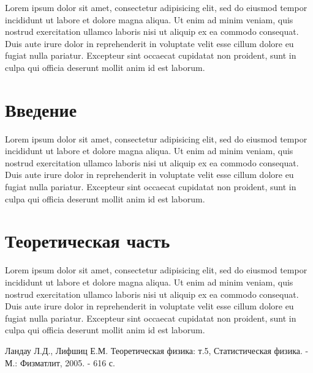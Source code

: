 \documentclass[a4paper,14pt]{extarticle}
\begin{document}
Lorem ipsum dolor sit amet, consectetur adipisicing elit, sed do eiusmod
tempor incididunt ut labore et dolore magna aliqua. Ut enim ad minim veniam,
quis nostrud exercitation ullamco laboris nisi ut aliquip ex ea commodo
consequat. Duis aute irure dolor in reprehenderit in voluptate velit esse
cillum dolore eu fugiat nulla pariatur. Excepteur sint occaecat cupidatat non
proident, sunt in culpa qui officia deserunt mollit anim id est laborum.


\section*{Введение}

Lorem ipsum dolor sit amet, consectetur adipisicing elit, sed do eiusmod
tempor incididunt ut labore et dolore magna aliqua. Ut enim ad minim veniam,
quis nostrud exercitation ullamco laboris nisi ut aliquip ex ea commodo
consequat. Duis aute irure dolor in reprehenderit in voluptate velit esse
cillum dolore eu fugiat nulla pariatur. Excepteur sint occaecat cupidatat non
proident, sunt in culpa qui officia deserunt mollit anim id est laborum.

\section{Теоретическая часть}

Lorem ipsum dolor sit amet, consectetur adipisicing elit, sed do eiusmod
tempor incididunt ut labore et dolore magna aliqua. Ut enim ad minim veniam,
quis nostrud exercitation ullamco laboris nisi ut aliquip ex ea commodo
consequat. Duis aute irure dolor in reprehenderit in voluptate velit esse
cillum dolore eu fugiat nulla pariatur. Excepteur sint occaecat cupidatat non
proident, sunt in culpa qui officia deserunt mollit anim id est laborum.

\begin{thebibliography}{99}
 Ландау Л.Д., Лифшиц Е.М. Теоретическая физика: т.5, Статистическая физика. - М.: Физматлит, 2005. - 616 с.
\end{thebibliography}
\end{document}
